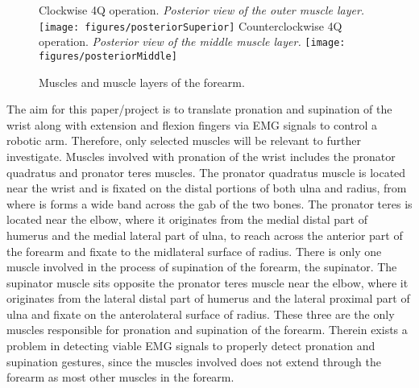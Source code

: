 \begin{figure}[H]
	\subcaptionbox  %
	{               %
		Clockwise 4Q operation.\newline                              %
		\emph{Posterior view of the outer muscle layer. \cite{martini}}                %
		\label{fig:postSuperior}                                  %
	}                                                                 %
	{                                                                  %
		\texttt{[image: figures/posteriorSuperior]}         %
	}                                                                    %
	\hspace{5pt}                                                          %
	\subcaptionbox  %
	{                                                                       %
		Counterclockwise 4Q operation.\newline                                 %
		\emph{Posterior view of the middle muscle layer.\cite{martini}}                          %
		\label{fig:postMiddle}                                     %
	}                                                                           %
	{                                                                            %
		\texttt{[image: figures/posteriorMiddle]}            %
	}                                                                             %
	\caption{Muscles and muscle layers of the forearm.}%
	\label{fig:musclesForarm}
\end{figure}

The aim for this paper/project is to translate pronation and supination of the wrist along with extension and flexion fingers via EMG signals to control a robotic arm. Therefore, only selected muscles will be relevant to further investigate. 
Muscles involved with pronation of the wrist includes the pronator quadratus and pronator teres muscles. The pronator quadratus muscle is located near the wrist and is fixated on the distal portions of both ulna and radius, from where is forms a wide band across the gab of the two bones. The pronator teres is located near the elbow, where it originates  from the medial distal part of humerus and the medial lateral part of ulna, to reach across the anterior part of the forearm and fixate to the midlateral surface of radius. 
There is only one muscle involved in the process of supination of the forearm, the supinator. The supinator muscle sits opposite the pronator teres muscle near the elbow, where it originates from the lateral distal part of humerus and the lateral proximal part of ulna and fixate on the anterolateral surface of radius. 
These three are the only muscles responsible for pronation and supination of the forearm. Therein exists a problem in detecting viable EMG signals to properly detect pronation and supination gestures, since the muscles involved does not extend through the forearm as most other muscles in the forearm. 


